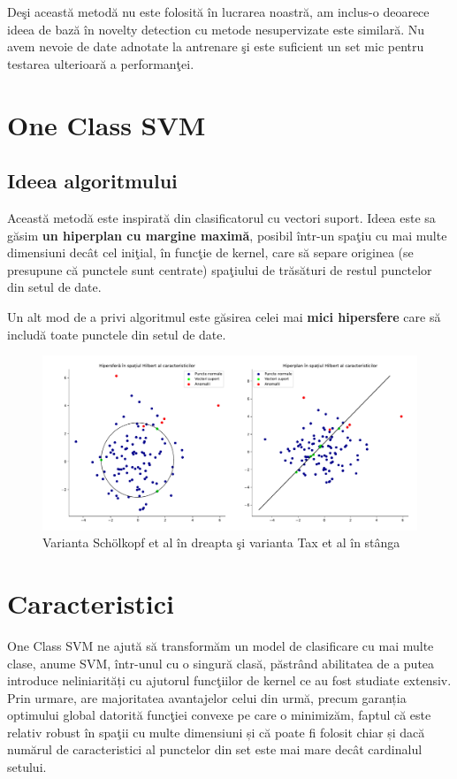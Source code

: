 Deşi această metodă nu este folosită în lucrarea noastră, am inclus-o deoarece 
ideea de bază în novelty detection cu metode nesupervizate este similară. Nu avem 
nevoie de date adnotate la antrenare şi este suficient un set mic pentru testarea 
ulterioară a performanţei.

\section{One Class SVM}

\subsection{Ideea algoritmului}

Această metodă este inspirată din clasificatorul cu vectori suport. Ideea este 
sa găsim \textbf{un hiperplan cu margine maximă}, posibil într-un spaţiu cu 
mai multe dimensiuni decât cel iniţial, în funcţie de kernel,
care să separe originea (se presupune că punctele sunt centrate) spaţiului de trăsături
de restul punctelor din setul de date\cite{scholkopf2000support}.

Un alt mod de a privi algoritmul este găsirea celei mai \textbf{mici 
hipersfere} care să includă toate punctele din setul de date\cite{tax2004support}.

\begin{figure}[H]
    \centering
    \includegraphics[width=\linewidth]{images/cvx_ocsvm_figures.pdf}
    \caption{Varianta Schölkopf et al în dreapta şi varianta Tax et al în stânga}
\end{figure}

\section{Caracteristici}

One Class SVM ne ajută să transformăm un model de clasificare 
cu mai multe clase, anume SVM, într-unul cu o singură clasă,
păstrând abilitatea de a putea introduce neliniarități 
cu ajutorul funcţiilor de kernel ce au fost studiate extensiv.
Prin urmare, are majoritatea avantajelor celui din urmă, precum
garanția optimului global datorită funcţiei convexe pe care
o minimizăm, faptul că este relativ robust în spaţii cu 
multe dimensiuni și că poate fi folosit chiar și dacă 
numărul de caracteristici al punctelor din set este mai
mare decât cardinalul setului.

